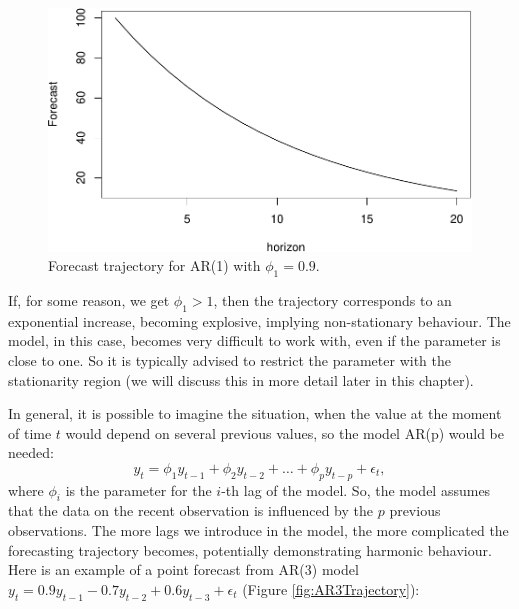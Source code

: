 \documentclass[
]{book}
\theoremstyle{definition}
\theoremstyle{definition}
\theoremstyle{definition}
\theoremstyle{definition}
\theoremstyle{remark}
\begin{document}
\begin{figure}
\centering
\includegraphics{Svetunkov--2022----ADAM_files/figure-latex/AR1Trajectory-1.pdf}
\caption{\label{fig:AR1Trajectory}Forecast trajectory for AR(1) with \(\phi_1=0.9\).}
\end{figure}

If, for some reason, we get \(\phi_1>1\), then the trajectory corresponds to an exponential increase, becoming explosive, implying non-stationary behaviour. The model, in this case, becomes very difficult to work with, even if the parameter is close to one. So it is typically advised to restrict the parameter with the stationarity region (we will discuss this in more detail later in this chapter).

In general, it is possible to imagine the situation, when the value at the moment of time \(t\) would depend on several previous values, so the model AR(p) would be needed:
\begin{equation}
  {y}_{t} = \phi_1 y_{t-1} + \phi_2 y_{t-2} + \dots + \phi_p y_{t-p} + \epsilon_t ,
  \label{eq:ARIMAp00Example}
\end{equation}
where \(\phi_i\) is the parameter for the \(i\)-th lag of the model. So, the model assumes that the data on the recent observation is influenced by the \(p\) previous observations. The more lags we introduce in the model, the more complicated the forecasting trajectory becomes, potentially demonstrating harmonic behaviour. Here is an example of a point forecast from AR(3) model \({y}_{t} = 0.9 y_{t-1} -0.7 y_{t-2} + 0.6 y_{t-3} + \epsilon_t\) (Figure \ref{fig:AR3Trajectory}):
\end{document}
